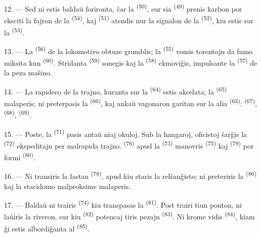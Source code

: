 12. --- Sed ni estis baldaŭ forironta, ĉar la 
\textsuperscript{(50)}, sur sia  \textsuperscript{(49)} prenis
karbon por eksciti la fajron de la  \textsuperscript{(54)},
kaj  \textsuperscript{(51)} atendis nur la signalon de la
 \textsuperscript{(52)}, kiu estis sur la
 \textsuperscript{(53)}.

13. --- La  \textsuperscript{(56)} de la lokomotivo obtuze
grumblis; la  \textsuperscript{(55)} vomis torentojn da fumo
miksita kun  \textsuperscript{(60)}. Stridanta 
\textsuperscript{(59)} sonegis kaj la  \textsuperscript{(58)}
ekmoviĝis, impulsante la  \textsuperscript{(57)} de la peza
maŝino.

\VUsaut{3.0mm}
\VUsaut{3.0mm}

14. --- La rapideco de la trajno, kuranta sur la 
\textsuperscript{(64)} estis akcelata; la 
\textsuperscript{(65)} malaperis; ni preterpasis la 
\textsuperscript{(66)}, kaj ankaŭ vagonaron garitan sur la alia 
\textsuperscript{(63)}:  \textsuperscript{(67)},
 \textsuperscript{(68)}, 
\textsuperscript{(69)}.


15. --- Poste, la  \textsuperscript{(71)} pasis
antaŭ niaj okuloj. Sub la hangaroj, oficistoj ŝarĝis la 
\textsuperscript{(72)} ekspeditajn per malrapida trajno. 
\textsuperscript{(76)} apud la  \textsuperscript{(73)}
manovris  \textsuperscript{(75)} kaj  \textsuperscript{(79)} por formi 
\textsuperscript{(80)}.

16. --- Ni transiris la lastan  \textsuperscript{(78)},
apud kiu staris la relŝanĝisto; ni preteriris la 
\textsuperscript{(86)} kaj la stacidomo malproksime malaperis.

17. --- Baldaŭ ni trairis  \textsuperscript{(74)} kiu
transpasas la  \textsuperscript{(81)}. Post trairi tiun ponton,
ni laŭiris la riveron, sur kiu  \textsuperscript{(82)}
potencaj tiris pezajn  \textsuperscript{(83)}. Ni krome
vidis  \textsuperscript{(84)}, kiam ĝi estis albordiĝanta al
 \textsuperscript{(85)}.

